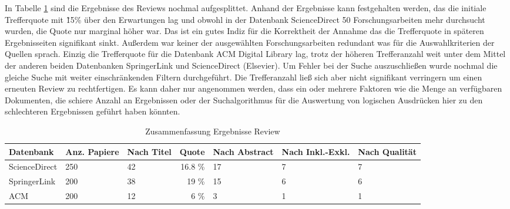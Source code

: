 In Tabelle \ref{tab:quellenauswahl_quote} sind die Ergebnisse des Reviews nochmal aufgesplittet. Anhand der Ergebnisse kann festgehalten werden, das die initiale Trefferquote mit \~15\% über den Erwartungen lag und obwohl in der Datenbank ScienceDirect 50 Forschungsarbeiten mehr durchsucht wurden, die Quote nur marginal höher war. Das ist ein gutes Indiz für die Korrektheit der Annahme das die Trefferquote in späteren Ergebnisseiten signifikant sinkt. Außerdem war keiner der ausgewählten Forschungsarbeiten redundant was für die Auswahlkriterien der Quellen sprach. Einzig die Trefferquote für die Datenbank ACM Digital Library lag, trotz der höheren Trefferanzahl weit unter dem Mittel der anderen beiden Datenbanken SpringerLink und ScienceDirect (Elsevier). Um Fehler bei der Suche auszuschließen wurde nochmal die gleiche Suche mit weiter einschränkenden Filtern durchgeführt. Die Trefferanzahl ließ sich aber nicht signifikant verringern um einen erneuten Review zu rechtfertigen. Es kann daher nur angenommen werden, dass ein oder mehrere Faktoren wie die Menge an verfügbaren Dokumenten, die schiere Anzahl an Ergebnissen oder der Suchalgorithmus für die Auswertung von logischen Ausdrücken hier zu den schlechteren Ergebnissen geführt haben könnten.


\begin{table}[!ht]
\renewcommand{\arraystretch}{1.3}
\centering
\begin{threeparttable}
\begin{tabularx}{\columnwidth}{@{}lXXrXXX@{}}
\toprule
Datenbank & Anz. Papiere & Nach Titel & Quote & Nach Abstract & Nach Inkl.-Exkl. & Nach Qualität \\ \midrule
ScienceDirect & 250 & 42 & 16.8 \% & 17 & 7 & 7 \\
SpringerLink & 200 &  38 & 19 \% & 15 & 6 & 6 \\
ACM & 200 & 12 & 6 \% & 3 & 1 & 1 \\
\bottomrule
\end{tabularx}
\medskip
\end{threeparttable}
\caption{Zusammenfassung Ergebnisse Review}
\label{tab:quellenauswahl_quote}
\end{table}

